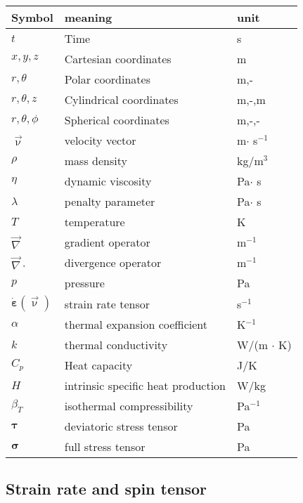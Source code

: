 
\begin{center}
\begin{tabular}{lll}
\hline
Symbol & meaning & unit \\
\hline
\hline
$t$ & Time & s \\
$x,y,z$ & Cartesian coordinates & m \\
$r,\theta$ & Polar coordinates & m,-\\
$r,\theta, z$ & Cylindrical coordinates & m,-,m\\
$r,\theta,\phi$ & Spherical coordinates & m,-,- \\
${\vec \upnu}$ & velocity vector & m$\cdot$ s$^{-1}$\\
$\rho$ & mass density & kg/m$^3$ \\
$\eta$ & dynamic viscosity &  Pa$\cdot$ s \\
$\lambda$ & penalty parameter & Pa$\cdot$ s \\
$T$ & temperature & K \\
${\vec \nabla}$ & gradient operator & m$^{-1}$ \\
${\vec \nabla}\cdot$ & divergence operator & m$^{-1}$ \\
$p$ & pressure & Pa\\
$\dot{\bm \varepsilon}({\vec \upnu})$ & strain rate tensor & s$^{-1}$ \\
$\alpha$ & thermal expansion coefficient & K$^{-1}$ \\
$k$ & thermal conductivity & W/(m $\cdot$ K) \\
$C_p$ & Heat capacity & J/K \\
$H$ & intrinsic specific heat production & W/kg\\
$\beta_T$ & isothermal compressibility & Pa$^{-1}$  \\
${\bm \tau}$ & deviatoric stress tensor & Pa \\
${\bm \sigma}$ & full stress tensor & Pa \\
\hline
\end{tabular}
\end{center}

\subsection{Strain rate and spin tensor}

